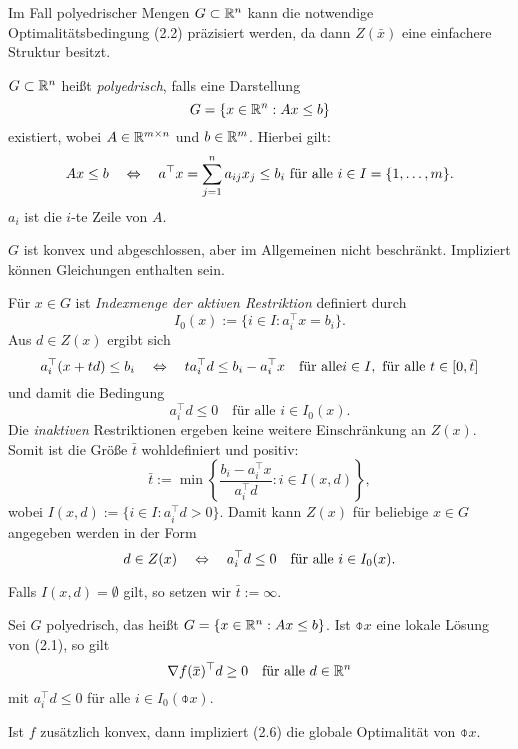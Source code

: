 Im Fall polyedrischer Mengen $G \subset \mathbb{R}^n$ kann die notwendige
Optimalitätsbedingung (2.2) präzisiert werden, da dann $Z(\bar{x})$ eine
einfachere Struktur besitzt.

\begin{defn} %
  $G \subset \mathbb{R}^n$ heißt \emph{polyedrisch}, falls eine Darstellung
  \[ G = \{ x \in \mathbb{R}^n : Ax \le b \} \]
  existiert, wobei $A \in \mathbb{R}^{m \times n}$ und $b \in \mathbb{R}^m$. Hierbei gilt:
  \[ Ax \le b \quad \Leftrightarrow \quad a^\top x = \sum_{j=1}^n a_{ij} x_j \le b_i \text{ für alle } i
    \in I = \{ 1, \ldots, m \}. \]
  $a_i$ ist die $i$-te Zeile von $A$.
\end{defn}

\begin{rmrk} %
  $G$ ist konvex und abgeschlossen, aber im Allgemeinen nicht beschränkt.
  Impliziert können Gleichungen enthalten sein.
\end{rmrk}

\begin{defn} %
  Für $x \in G$ ist \emph{Indexmenge der aktiven Restriktion} definiert durch
  \[ I_0(x) := \{ i \in I : a_i^\top x = b_i \}. \]
  Aus $d \in Z(x)$ ergibt sich
  \[ a_i^\top (x + t d) \le b_i \quad \Leftrightarrow \quad t a_i^\top  d \le b_i - a_i^\top x \quad
    \text{für alle} i \in I, \text{ für alle } t \in [0, \bar{t}] \]
  und damit die Bedingung
  \[ a_i^\top d \le 0 \quad \text{für alle } i \in I_0(x). \]
  Die \emph{inaktiven} Restriktionen ergeben keine weitere Einschränkung an
  $Z(x)$. Somit ist die Größe $\bar{t}$ wohldefiniert und positiv:
  \begin{equation} %
    \bar{t} := \min \left\{ \frac{b_i - a_i^\top x}{a_i^\top d} : i \in I(x,d)
    \right\},
  \end{equation}
  wobei $I(x,d) := \{ i \in I: a_i^\top d > 0 \}$. Damit kann $Z(x)$ für beliebige
  $x \in G$ angegeben werden in der Form
  \begin{equation} %
    d \in Z(x) \qLRq a_i^\top d \le 0 \quad \text{für alle } i \in I_0(x).
  \end{equation}
\end{defn}

\begin{rmrk} %
  Falls $I(x,d) = \emptyset$ gilt, so setzen wir $\bar{t} := \infty$.
\end{rmrk}

\begin{flg} %
  Sei $G$ polyedrisch, das heißt $G = \{ x \in \mathbb{R}^n : Ax \le b\}$. Ist
  $\obar{x}$ eine lokale Lösung von (2.1), so gilt
  \begin{equation} %
    \nabla f( \obar{x} )^\top d \ge 0 \quad \text{für alle } d \in \real^n
  \end{equation}
  mit $a_i^\top d \le 0$ für alle $i \in I_0(\obar{x})$.

  Ist $f$ zusätzlich konvex, dann impliziert (2.6) die globale Optimalität von
  $\obar{x}$.
\end{flg}

